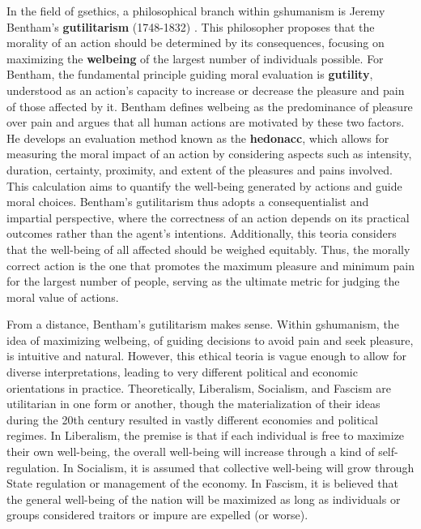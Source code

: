 \documentclass[./main_en.tex]{subfiles}
\begin{document}
\par In the field of \gls{gsethics}, a philosophical branch within \gls{gshumanism} is Jeremy Bentham’s \textbf{\gls{gutilitarism}} (1748-1832) \cite{Gordon2002a}. This philosopher proposes that the morality of an action should be determined by its consequences, focusing on maximizing the \textbf{\gls{welbeing}} of the largest number of individuals possible. For Bentham, the fundamental principle guiding moral evaluation is \textbf{\gls{gutility}}, understood as an action's capacity to increase or decrease the pleasure and pain of those affected by it. Bentham defines \gls{welbeing} as the predominance of pleasure over pain and argues that all human actions are motivated by these two factors. He develops an evaluation method known as the \textbf{\gls{hedonacc}}, which allows for measuring the moral impact of an action by considering aspects such as intensity, duration, certainty, proximity, and extent of the pleasures and pains involved. This calculation aims to quantify the well-being generated by actions and guide moral choices. Bentham’s \gls{gutilitarism} thus adopts a consequentialist and impartial perspective, where the correctness of an action depends on its practical outcomes rather than the agent's intentions. Additionally, this \gls{teoria} considers that the well-being of all affected should be weighed equitably. Thus, the morally correct action is the one that promotes the maximum pleasure and minimum pain for the largest number of people, serving as the ultimate metric for judging the moral value of actions.

\par From a distance, Bentham’s \gls{gutilitarism} makes sense. Within \gls{gshumanism}, the idea of maximizing \gls{welbeing}, of guiding decisions to avoid pain and seek pleasure, is intuitive and natural. However, this ethical \gls{teoria} is vague enough to allow for diverse interpretations, leading to very different political and economic orientations in practice. Theoretically, Liberalism, Socialism, and Fascism are utilitarian in one form or another, though the materialization of their ideas during the 20th century resulted in vastly different economies and political regimes. In Liberalism, the premise is that if each individual is free to maximize their own well-being, the overall well-being will increase through a kind of self-regulation. In Socialism, it is assumed that collective well-being will grow through State regulation or management of the economy. In Fascism, it is believed that the general well-being of the nation will be maximized as long as individuals or groups considered traitors or impure are expelled (or worse).
\end{document}
